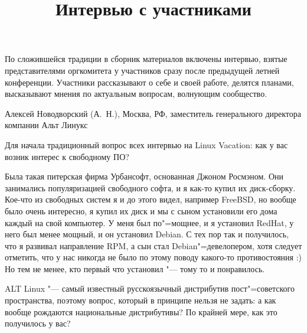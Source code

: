 \documentclass[10pt, a5paper]{article}
\begin{document}
\title{Интервью с участниками}
\date{}
\maketitle

По сложившейся традиции в сборник материалов включены интервью, взятые представителями оргкомитета у участников сразу после предыдущей летней конференции. Участники рассказывают о себе и своей работе, делятся планами, высказывают мнения по актуальным вопросам, волнующим сообщество. 

\interview Алексей Новодворский (А.~Н.), Москва, РФ, заместитель генерального директора компании Альт Линукс

\q Для начала традиционный вопрос всех интервью на Linux Vacation: как у вас возник интерес к свободному ПО?

\a  Была такая питерская фирма Урбансофт, основанная Джоном Росмэном. Они занимались популяризацией свободного софта, и я как-то купил их диск-сборку. Кое-что из свободных систем я и до этого видел, например FreeBSD, но вообще было очень интересно, я купил их диск и мы с сыном установили его дома каждый на свой компьютер. У меня был по"=мощнее, и я установил RedHat,  у него был менее мощный, и он установил Debian. С тех пор так и получилось, что  я развивал направление  RPM, а сын стал Debian"=девелопером, хотя следует отметить, что у нас никогда не было по этому поводу какого-то противостояния :)  Но тем не менее, кто первый что установил "--- тому то и понравилось. 

\q ALT Linux "--- самый известный русскоязычный дистрибутив пост"=советского пространства, поэтому вопрос, который в принципе нельзя не задать: а как вообще рождаются национальные дистрибутивы? По крайней мере, как это получилось у вас?
\end{document}
